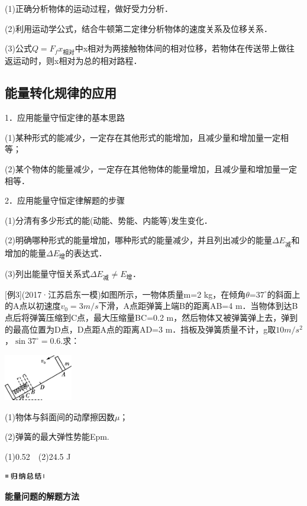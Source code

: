 (1)正确分析物体的运动过程，做好受力分析．

(2)利用运动学公式，结合牛顿第二定律分析物体的速度关系及位移关系．

(3)公式$Q=F_fx_{\text{相对}}$中x相对为两接触物体间的相对位移，若物体在传送带上做往返运动时，则x相对为总的相对路程．

\newpage
\subsection{能量转化规律的应用}

1．应用能量守恒定律的基本思路

(1)某种形式的能减少，一定存在其他形式的能增加，且减少量和增加量一定相等；

(2)某个物体的能量减少，一定存在其他物体的能量增加，且减少量和增加量一定相等．

2．应用能量守恒定律解题的步骤

(1)分清有多少形式的能(动能、势能、内能等)发生变化．

(2)明确哪种形式的能量增加，哪种形式的能量减少，并且列出减少的能量$\Delta E_{\text{减}}$和增加的能量$\Delta E_{\text{增}}$的表达式．

(3)列出能量守恒关系式$\Delta E_{\text{减}}\neq E_{\text{增}}$．

{[}例3{]}(2017·江苏启东一模)如图所示，一物体质量m=2
kg，在倾角$\theta$=$37^\circ$的斜面上的A点以初速度$v_0=3m/s$下滑，A点距弹簧上端B的距离AB=4
m．当物体到达B点后将弹簧压缩到C点，最大压缩量BC=0.2
m，然后物体又被弹簧弹上去，弹到的最高位置为D点，D点距A点的距离AD=3
m．挡板及弹簧质量不计，g取$10m/s^2$，$\sin 37^\circ=0.6$.求：

\begin{center}\includegraphics[width=1.17917in,height=0.79236in]{media/image242.png}\end{center}

(1)物体与斜面间的动摩擦因数$\mu$；

(2)弹簧的最大弹性势能Epm.
\begin{solution}
	(1)0.52　(2)24.5 J
\end{solution}


\begin{center}\includegraphics[width=0.70764in,height=0.12292in]{media/image13.png}

\textbf{能量问题的解题方法}
\end{center}



